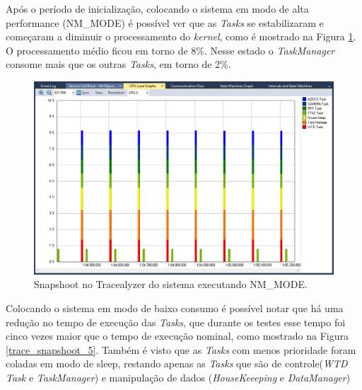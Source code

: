 \newpage
Após o período de inicialização, colocando o sistema em modo de alta performance (NM\_MODE) é possível ver que as \textit{Tasks} se estabilizaram e começaram a diminuir o processamento do \textit{kernel}, como é mostrado na Figura \ref{trace_snapshoot_3}. O processamento médio ficou em torno de 8\%. Nesse estado o \textit{TaskManager} consome mais que os outras \textit{Tasks}, em torno de 2\%. 

\begin{figure}[h]
	\centering
	\caption{Snapshoot no Tracealyzer do sistema executando NM\_MODE.}
	\includegraphics[keepaspectratio=true,scale=0.51]{figuras/trace_snapshoot_3.PNG}
	
	\label{trace_snapshoot_3}
\end{figure}

\newpage
Colocando o sistema em modo de baixo consumo é possível notar que há uma redução no tempo de execução das \textit{Tasks}, que durante os testes esse tempo foi cinco vezes maior que o tempo de execução nominal, como mostrado na Figura \ref{trace_snapshoot_5}. Também é visto que as \textit{Tasks} com menos prioridade foram coladas em modo de sleep, restando apenas as \textit{Tasks} que são de controle(\textit{WTD Task} e \textit{TaskManager}) e manipulação de dados (\textit{HouseKeeeping} e \textit{DataManager})

